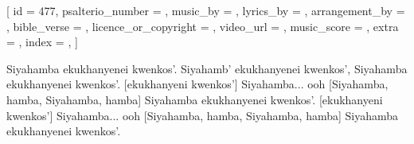 % 

[
    id                     = {477},
    psalterio_number       = {},
    music_by               = {},
    lyrics_by              = {},
    arrangement_by         = {},
    bible_verse            = {},
    licence_or_copyright   = {},
    video_url              = {},
    music_score            = {},
    extra                  = {},
    index                  = {},
]


\beginchorus
Siyahamba ekukhanyenei kwenkos'.
Siyahamb' ekukhanyenei kwenkos',
Siyahamba ekukhanyenei kwenkos'. [ekukhanyeni kwenkos']
Siyahamba... ooh
[Siyahamba, hamba, Siyahamba, hamba]
Siyahamba ekukhanyenei kwenkos'. [ekukhanyeni kwenkos']
Siyahamba... ooh
[Siyahamba, hamba, Siyahamba, hamba]
Siyahamba ekukhanyenei kwenkos'.
\endchorus

\endsong